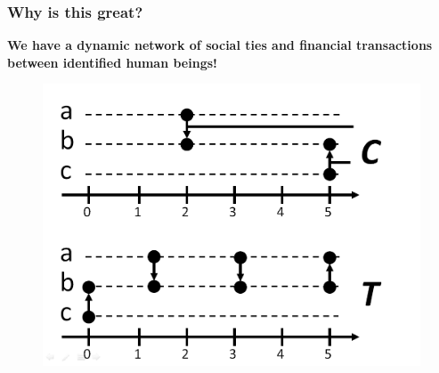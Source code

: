 \documentclass{beamer}
\begin{document}
\begin{frame}
\begin{center}
\begin{figure}
		\end{figure}
	\end{center}	
\end{frame}


\begin{frame}
	\frametitle{Why is this great?}
	\textbf{{\footnotesize We have a dynamic network of social ties and financial transactions between identified human beings!}}
	\begin{center}
		\begin{figure}
			\includegraphics[width=.8\linewidth]{./figures/delta-t-0}
		\end{figure}
	\end{center}
\end{frame}
\end{document}
